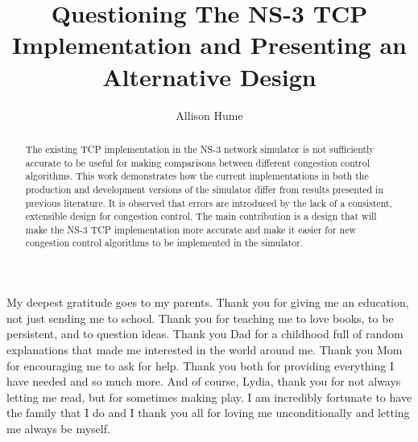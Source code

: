 \documentclass[11pt]{ucthesis}
\begin{document}

\title{Questioning The NS-3 TCP Implementation and Presenting an Alternative Design}
\author{Allison Hume}
\deanlinethree{}

\begin{frontmatter}

\maketitle

\copyrightpage

\tableofcontents
\listoffigures
\listoftables

\begin{abstract}
The existing TCP implementation in the NS-3 network simulator is not sufficiently accurate to be useful for making comparisons between different congestion control algorithms. This work demonstrates how the current implementations in both the production and development versions of the simulator differ from results presented in previous literature. It is observed that errors are introduced by the lack of a consistent, extensible design for congestion control. The main contribution is a design that will make the NS-3 TCP implementation more accurate and make it easier for new congestion control algorithms to be implemented in the simulator.  
\end{abstract}



\begin{acknowledgements}

My deepest gratitude goes to my parents. Thank you for giving me an education, not just sending me to school. Thank you for teaching me to love books, to be persistent, and to question ideas. Thank you Dad for a childhood full of random explanations that made me interested in the world around me. Thank you Mom for encouraging me to ask for help. Thank you both for providing everything I have needed and so much more. And of course, Lydia, thank you for not always letting me read, but for sometimes making play. I am incredibly fortunate to have the family that I do and I thank you all for loving me unconditionally and letting me always be myself.


\end{acknowledgements}
\end{frontmatter}
\end{document}
